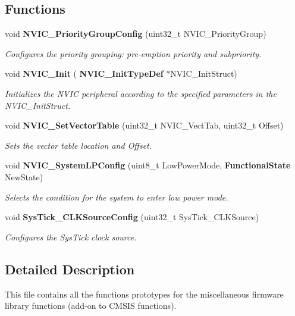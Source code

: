 \subsection*{Functions}
\begin{DoxyCompactItemize}
\item 
void \textbf{ N\+V\+I\+C\+\_\+\+Priority\+Group\+Config} (uint32\+\_\+t N\+V\+I\+C\+\_\+\+Priority\+Group)
\begin{DoxyCompactList}\small\item\em Configures the priority grouping\+: pre-\/emption priority and subpriority. \end{DoxyCompactList}\item 
void \textbf{ N\+V\+I\+C\+\_\+\+Init} (\textbf{ N\+V\+I\+C\+\_\+\+Init\+Type\+Def} $\ast$N\+V\+I\+C\+\_\+\+Init\+Struct)
\begin{DoxyCompactList}\small\item\em Initializes the N\+V\+IC peripheral according to the specified parameters in the N\+V\+I\+C\+\_\+\+Init\+Struct. \end{DoxyCompactList}\item 
void \textbf{ N\+V\+I\+C\+\_\+\+Set\+Vector\+Table} (uint32\+\_\+t N\+V\+I\+C\+\_\+\+Vect\+Tab, uint32\+\_\+t Offset)
\begin{DoxyCompactList}\small\item\em Sets the vector table location and Offset. \end{DoxyCompactList}\item 
void \textbf{ N\+V\+I\+C\+\_\+\+System\+L\+P\+Config} (uint8\+\_\+t Low\+Power\+Mode, \textbf{ Functional\+State} New\+State)
\begin{DoxyCompactList}\small\item\em Selects the condition for the system to enter low power mode. \end{DoxyCompactList}\item 
void \textbf{ Sys\+Tick\+\_\+\+C\+L\+K\+Source\+Config} (uint32\+\_\+t Sys\+Tick\+\_\+\+C\+L\+K\+Source)
\begin{DoxyCompactList}\small\item\em Configures the Sys\+Tick clock source. \end{DoxyCompactList}\end{DoxyCompactItemize}


\subsection{Detailed Description}
This file contains all the functions prototypes for the miscellaneous firmware library functions (add-\/on to C\+M\+S\+IS functions). 

